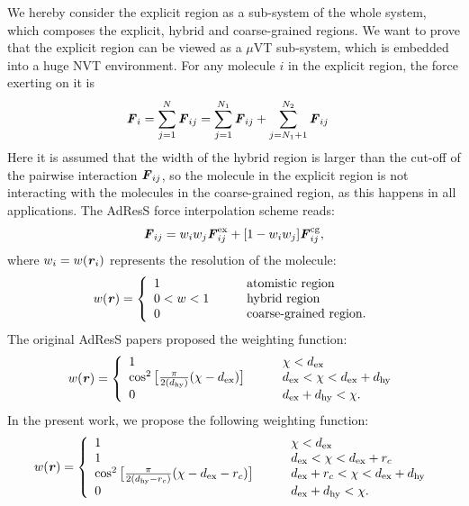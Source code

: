 \documentclass[aps,pre,preprint,unsortedaddress]{revtex4}
\renewcommand{\v}[1]{\textbf{\textit{#1}}}
\begin{document}
We hereby consider the explicit region as a sub-system of the whole
system, which composes the explicit, hybrid and coarse-grained
regions. We want to prove that the explicit region can be viewed as a
$\mu$VT sub-system, which is embedded into a huge NVT environment.
For any molecule $i$ in the explicit region, the force exerting on
it is
\begin{align}
  \v F_i &= \sum_{j=1}^{N}\v F_{ij} 
  =
  \sum_{j=1}^{N_1}\v F_{ij} + \sum_{j=N_1+1}^{N_2}\v F_{ij} 
\end{align}
Here it is assumed that the width of the hybrid region is larger than
the cut-off of the pairwise interaction $\v F_{ij}$, so the molecule
in the explicit region is not interacting with the molecules in the
coarse-grained region, as this happens in all applications.
The AdResS force interpolation scheme reads:
\begin{align}\label{eqn:f-interp}
  \v F_{ij} = w_iw_j\v F^{\textrm{ex}}_{ij} + [1-w_iw_j]\v F^{\textrm{cg}}_{ij},
\end{align}
where $w_i = w(\v r_i)$ represents
the resolution of the molecule:
\begin{align}\label{eqn:w1}
  w(\v r) =
  \left\{
    \begin{array}{lcl}
      1 &\quad& \textrm{atomistic region}\\
      0<w<1  && \textrm{hybrid region}\\
      0 && \textrm{coarse-grained region}.
    \end{array}
  \right.
\end{align}
The original AdResS papers proposed the weighting function:
\begin{align}\label{eqn:old-w}
  w(\v r) =
  \left\{
    \begin{array}{lcl}
      1 &\quad& \chi < d_{\textrm{ex}}\\
      \cos^2\big[\frac{\pi}{2(d_{\textrm{hy}})} (\chi - d_{\textrm{ex}})\big] && d_{\textrm{ex}}  < \chi < d_{\textrm{ex}} + d_{\textrm{hy}} \\
      0 && d_{\textrm{ex}} + d_{\textrm{hy}}  < \chi.
    \end{array}
  \right.
\end{align}
In the present work, we propose the following weighting function:
\begin{align}\label{eqn:new-w}
  w(\v r) =
  \left\{
    \begin{array}{lcl}
      1 &\quad& \chi < d_{\textrm{ex}}\\
      1  && d_{\textrm{ex}} < \chi < d_{\textrm{ex}} + r_c\\
      \cos^2\big[\frac{\pi}{2(d_{\textrm{hy}} - r_c)} (\chi - d_{\textrm{ex}} - r_c)\big] && d_{\textrm{ex}} + r_c < \chi < d_{\textrm{ex}} + d_{\textrm{hy}} \\
      0 && d_{\textrm{ex}} + d_{\textrm{hy}}  < \chi.
    \end{array}
  \right.
\end{align}
\end{document}
